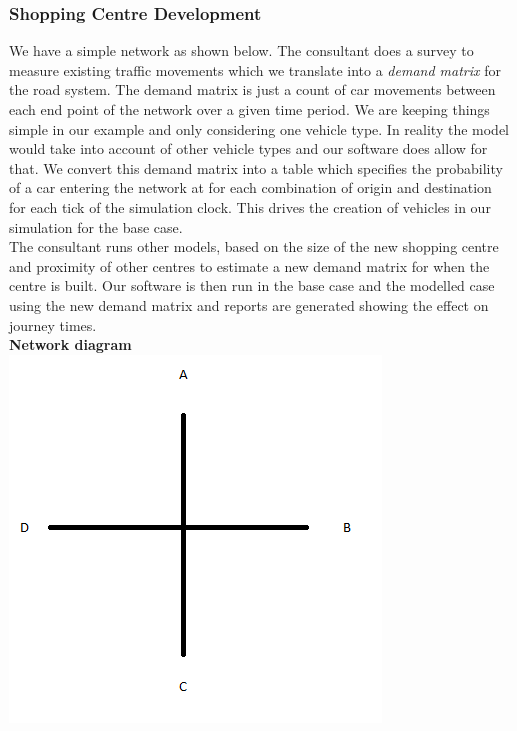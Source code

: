 \subsubsection{Shopping Centre Development}
We have a simple network as shown below.  The consultant does a survey to measure existing traffic movements which we translate into a \textit{demand matrix} for the road system.  The demand matrix is just a count of car movements between each end point of the network over a given time period.  We are keeping things simple in our example and only considering one vehicle type.  In reality the model would take into account of other vehicle types and our software does allow for that.  We convert this demand matrix into a table which specifies the probability of a car entering the network at for each combination of origin and destination for each tick of the simulation clock.  This drives the creation of vehicles in our simulation for the base case.  \\ The consultant runs other models, based on the size of the new shopping centre and proximity of other centres to estimate a new demand matrix for when the centre is built.  Our software is then run in the base case and the modelled case using the new demand matrix and reports are generated showing the effect on journey times.\\ \textbf{Network diagram}\\
\includegraphics[scale=0.5]{./images/network.png}

